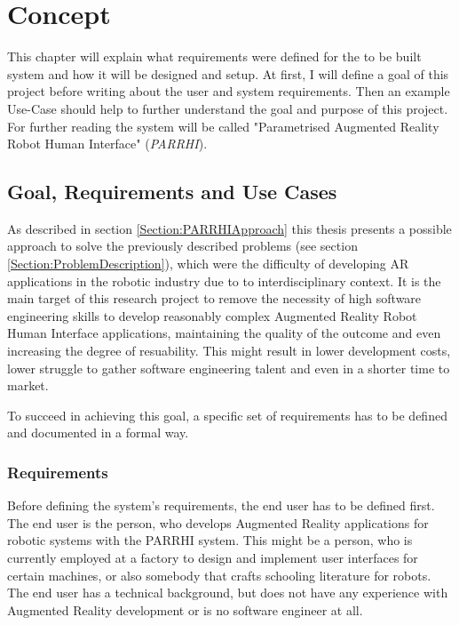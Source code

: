 \chapter{Concept}\label{Chap:Concept}

This chapter will explain what requirements were defined for the to be built system and how it will be designed and setup. At first, I will define a goal of this project before writing about the user and system requirements. Then an example Use-Case should help to further understand the goal and purpose of this project.  For further reading the system will be called "Parametrised Augmented Reality Robot Human Interface" (\textit{PARRHI}).

\section{Goal, Requirements and Use Cases}
As described in section \ref{Section:PARRHIApproach} this thesis presents a possible approach to solve the previously described problems (see section \ref{Section:ProblemDescription}), which were the difficulty of developing AR applications in the robotic industry due to to interdisciplinary context. It is the main target of this research project to remove the necessity of high software engineering skills to develop reasonably complex Augmented Reality Robot Human Interface applications, maintaining the quality of the outcome and even increasing the degree of resuability. This might result in lower development costs, lower struggle to gather software engineering talent and even in a shorter time to market.

To succeed in achieving this goal, a specific set of requirements has to be defined and documented in a formal way.

\subsection{Requirements}\label{Section:Requirements}

Before defining the system's requirements, the end user has to be defined first. The end user is the person, who develops Augmented Reality applications for robotic systems with the PARRHI system. This might be a person, who is currently employed at a factory to design and implement user interfaces for certain machines, or also somebody that crafts schooling literature for robots. The end user has a technical background, but does not have any experience with Augmented Reality development or is no software engineer at all.

